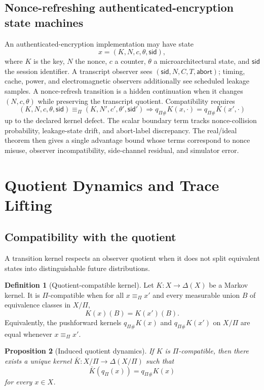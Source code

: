 \documentclass[11pt]{article}
\theoremstyle{definition}
\newtheorem{definition}{Definition}[section]
\theoremstyle{plain}
\newtheorem{proposition}[definition]{Proposition}
\theoremstyle{remark}
\newcommand{\DeltaS}{\Delta}
\newcommand{\eqobs}{\equiv_{\Pi}}
\begin{document}
\subsection{Nonce-refreshing authenticated-encryption state machines}

An authenticated-encryption implementation may have state
\[
    x=(K,N,c,\theta,\mathsf{sid}),
\]
where $K$ is the key, $N$ the nonce, $c$ a counter, $\theta$ a microarchitectural state, and $\mathsf{sid}$ the session identifier. A transcript observer sees $(\mathsf{sid},N,C,T,\mathsf{abort})$; timing, cache, power, and electromagnetic observers additionally see scheduled leakage samples. A nonce-refresh transition is a hidden continuation when it changes $(N,c,\theta)$ while preserving the transcript quotient. Compatibility requires
\[
(K,N,c,\theta,\mathsf{sid})\equiv_\Pi(K,N',c',\theta',\mathsf{sid}')
\Longrightarrow
q_{\Pi\#}K(x,\cdot)=q_{\Pi\#}K(x',\cdot)
\]
up to the declared kernel defect. The scalar boundary term tracks nonce-collision probability, leakage-state drift, and abort-label discrepancy. The real/ideal theorem then gives a single advantage bound whose terms correspond to nonce misuse, observer incompatibility, side-channel residual, and simulator error.

\section{Quotient Dynamics and Trace Lifting}

\subsection{Compatibility with the quotient}

A transition kernel respects an observer quotient when it does not split equivalent states into distinguishable future distributions.

\begin{definition}[Quotient-compatible kernel]
Let $K:X\to\DeltaS(X)$ be a Markov kernel. It is $\Pi$-compatible when for all $x\eqobs x'$ and every measurable union $B$ of equivalence classes in $X/\Pi$,
\[
    K(x)(B)=K(x')(B).
\]
Equivalently, the pushforward kernels $q_{\Pi\#}K(x)$ and $q_{\Pi\#}K(x')$ on $X/\Pi$ are equal whenever $x\eqobs x'$.
\end{definition}

\begin{proposition}[Induced quotient dynamics]
If $K$ is $\Pi$-compatible, then there exists a unique kernel $\bar K:X/\Pi\to\DeltaS(X/\Pi)$ such that
\[
    \bar K(q_{\Pi}(x)) = q_{\Pi\#}K(x)
\]
for every $x\in X$.
\end{proposition}
\end{document}
